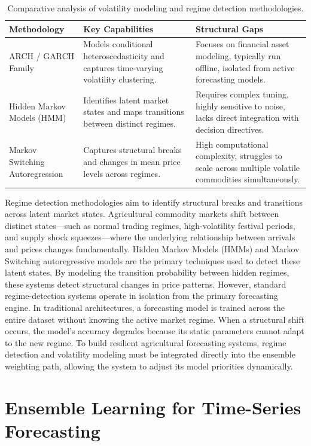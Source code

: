\documentclass[12pt,a4paper]{report}
\theoremstyle{definition}
\theoremstyle{remark}
\begin{document}
\begin{table}[htbp]
\centering
\caption{Comparative analysis of volatility modeling and regime detection methodologies.}
\label{tab:volatility_regime_comparison}
\begin{tabular}{p{3.5cm}|p{5.5cm}|p{5.5cm}}
\hline
\textbf{Methodology} & \textbf{Key Capabilities} & \textbf{Structural Gaps} \\
\hline
ARCH / GARCH Family & Models conditional heteroscedasticity and captures time-varying volatility clustering. & Focuses on financial asset modeling, typically run offline, isolated from active forecasting models. \\
\hline
Hidden Markov Models (HMM) & Identifies latent market states and maps transitions between distinct regimes. & Requires complex tuning, highly sensitive to noise, lacks direct integration with decision directives. \\
\hline
Markov Switching Autoregression & Captures structural breaks and changes in mean price levels across regimes. & High computational complexity, struggles to scale across multiple volatile commodities simultaneously. \\
\hline
\end{tabular}
\end{table}

Regime detection methodologies aim to identify structural breaks and transitions across latent market states. Agricultural commodity markets shift between distinct states—such as normal trading regimes, high-volatility festival periods, and supply shock squeezes—where the underlying relationship between arrivals and prices changes fundamentally. Hidden Markov Models (HMMs) and Markov Switching autoregressive models are the primary techniques used to detect these latent states. By modeling the transition probability between hidden regimes, these systems detect structural changes in price patterns. However, standard regime-detection systems operate in isolation from the primary forecasting engine. In traditional architectures, a forecasting model is trained across the entire dataset without knowing the active market regime. When a structural shift occurs, the model's accuracy degrades because its static parameters cannot adapt to the new regime. To build resilient agricultural forecasting systems, regime detection and volatility modeling must be integrated directly into the ensemble weighting path, allowing the system to adjust its model priorities dynamically.

\section{Ensemble Learning for Time-Series Forecasting}
\end{document}
